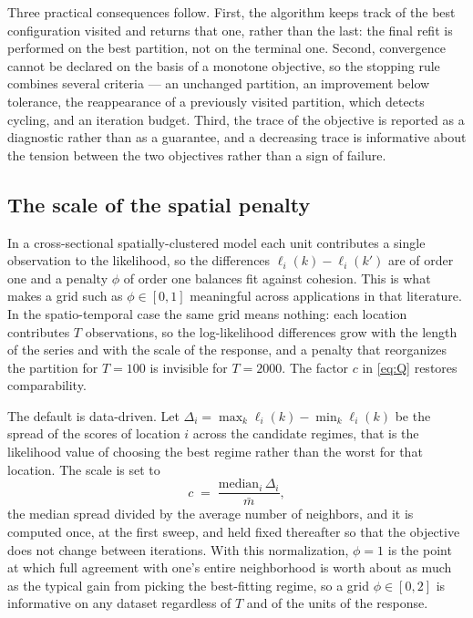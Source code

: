 Three practical consequences follow. First, the algorithm keeps track of the best configuration visited and returns that one, rather than the last: the final refit is performed on the best partition, not on the terminal one. Second, convergence cannot be declared on the basis of a monotone objective, so the stopping rule combines several criteria --- an unchanged partition, an improvement below tolerance, the reappearance of a previously visited partition, which detects cycling, and an iteration budget. Third, the trace of the objective is reported as a diagnostic rather than as a guarantee, and a decreasing trace is informative about the tension between the two objectives rather than a sign of failure.

\subsection{The scale of the spatial penalty}\label{sec:phiscale}

In a cross-sectional spatially-clustered model each unit contributes a single observation to the likelihood, so the differences $\ell_i(k) - \ell_i(k')$ are of order one and a penalty $\phi$ of order one balances fit against cohesion. This is what makes a grid such as $\phi \in [0,1]$ meaningful across applications in that literature. In the spatio-temporal case the same grid means nothing: each location contributes $T$ observations, so the log-likelihood differences grow with the length of the series and with the scale of the response, and a penalty that reorganizes the partition for $T=100$ is invisible for $T=2000$. The factor $c$ in \eqref{eq:Q} restores comparability.

The default is data-driven. Let $\Delta_i = \max_k \ell_i(k) - \min_k \ell_i(k)$ be the spread of the scores of location $i$ across the candidate regimes, that is the likelihood value of choosing the best regime rather than the worst for that location. The scale is set to
\begin{equation}\label{eq:cauto}
  c \;=\; \frac{\mathrm{median}_i\, \Delta_i}{\bar{m}},
\end{equation}
the median spread divided by the average number of neighbors, and it is computed once, at the first sweep, and held fixed thereafter so that the objective does not change between iterations. With this normalization, $\phi = 1$ is the point at which full agreement with one's entire neighborhood is worth about as much as the typical gain from picking the best-fitting regime, so a grid $\phi \in [0,2]$ is informative on any dataset regardless of $T$ and of the units of the response.

